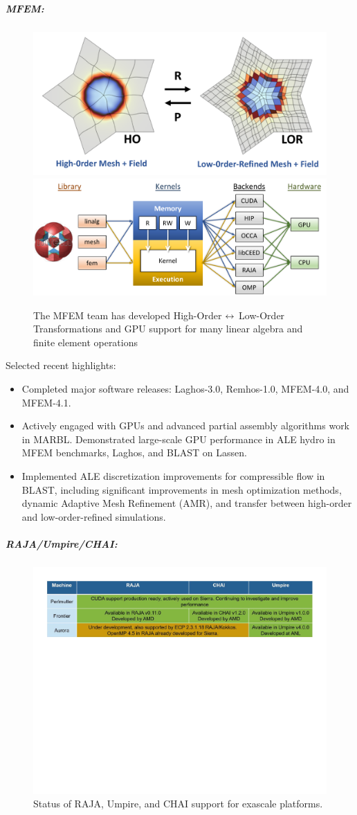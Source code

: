 \subparagraph{MFEM:}

\begin{figure}[tb]
\centering
\includegraphics[width=.4\textwidth]{projects/2.3.6-NNSA/2.3.6.02-LLNL-ATDM/HO-LO}
\includegraphics[width=.4\textwidth]{projects/2.3.6-NNSA/2.3.6.02-LLNL-ATDM/mfem-gpu}
\caption{The MFEM team has developed High-Order $\protect\leftrightarrow$ Low-Order Transformations and GPU support for many linear algebra and finite element operations}
\end{figure}

Selected recent highlights:
\begin{itemize}
\item Completed major software releases: Laghos-3.0, Remhos-1.0, MFEM-4.0, and MFEM-4.1. 
\item Actively engaged with GPUs and advanced partial assembly algorithms work in MARBL. Demonstrated large-scale GPU performance in ALE hydro in MFEM benchmarks, Laghos, and BLAST on Lassen. 
\item Implemented ALE discretization improvements for compressible flow in BLAST, including significant improvements in mesh optimization methods, dynamic Adaptive Mesh Refinement (AMR), and transfer between high-order and low-order-refined simulations. 

\end{itemize}

\subparagraph{RAJA/Umpire/CHAI:}
\begin{figure}[htb]
\centering
\includegraphics[width=\textwidth]{projects/2.3.6-NNSA/2.3.6.02-LLNL-ATDM/raja-umpire-chai-support}
\caption{
Status of RAJA, Umpire, and CHAI support for exascale platforms.
}
\end{figure}

